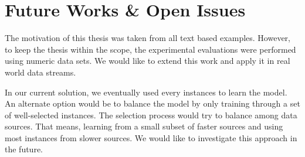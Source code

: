 \section{Future Works \& Open Issues}
The motivation of this thesis was taken from all text based examples. However, to keep the thesis within the scope, the experimental evaluations were performed using numeric data sets. We would like to extend this work and apply it  in real world data streams. 

In our current solution, we eventually used every instances to learn the model. An alternate option would be to balance the model by only training through a set of well-selected instances. The selection process would try to balance among data sources. That means, learning from a small subset of faster sources and using most instances from slower sources. We would like to investigate this approach in the future.





